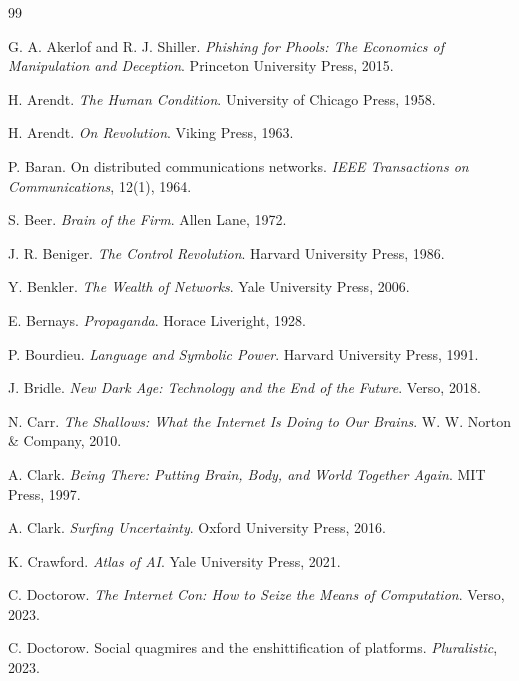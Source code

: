 \documentclass[12pt]{article}
\begin{document}
\newpage
\begin{thebibliography}{99}

G. A. Akerlof and R. J. Shiller.
\newblock \emph{Phishing for Phools: The Economics of Manipulation and Deception}.
\newblock Princeton University Press, 2015.

H. Arendt.
\newblock \emph{The Human Condition}.
\newblock University of Chicago Press, 1958.

H. Arendt.
\newblock \emph{On Revolution}.
\newblock Viking Press, 1963.

P. Baran.
\newblock On distributed communications networks.
\newblock \emph{IEEE Transactions on Communications}, 12(1), 1964.

S. Beer.
\newblock \emph{Brain of the Firm}.
\newblock Allen Lane, 1972.

J. R. Beniger.
\newblock \emph{The Control Revolution}.
\newblock Harvard University Press, 1986.

Y. Benkler.
\newblock \emph{The Wealth of Networks}.
\newblock Yale University Press, 2006.

E. Bernays.
\newblock \emph{Propaganda}.
\newblock Horace Liveright, 1928.

P. Bourdieu.
\newblock \emph{Language and Symbolic Power}.
\newblock Harvard University Press, 1991.

J. Bridle.
\newblock \emph{New Dark Age: Technology and the End of the Future}.
\newblock Verso, 2018.

N. Carr.
\newblock \emph{The Shallows: What the Internet Is Doing to Our Brains}.
\newblock W. W. Norton \& Company, 2010.

A. Clark.
\newblock \emph{Being There: Putting Brain, Body, and World Together Again}.
\newblock MIT Press, 1997.

A. Clark.
\newblock \emph{Surfing Uncertainty}.
\newblock Oxford University Press, 2016.

K. Crawford.
\newblock \emph{Atlas of AI}.
\newblock Yale University Press, 2021.

C. Doctorow.
\newblock \emph{The Internet Con: How to Seize the Means of Computation}.
\newblock Verso, 2023.

C. Doctorow.
\newblock Social quagmires and the enshittification of platforms.
\newblock \emph{Pluralistic}, 2023.


\end{thebibliography}
\end{document}
